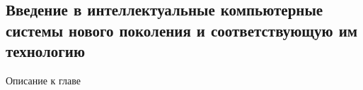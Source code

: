 \begin{partbacktext}
\part{Введение в интеллектуальные компьютерные системы нового поколения и соответствующую им технологию}
\noindent Описание к главе
\end{partbacktext}


